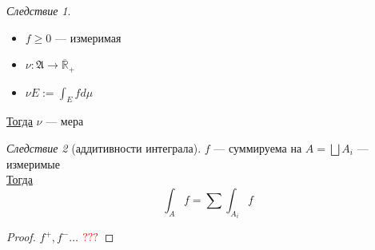 \documentclass[oneside]{book}
\newcommand{\R}{\mathbb{R}}
\newcommand{\A}{\mathfrak{A}}
\theoremstyle{plain}
\theoremstyle{remark}
\newtheorem{corollary}{Следствие}[theorem]
\theoremstyle{definition}
\begin{document}
\begin{corollary}
\begin{itemize}
\item \(f \ge 0\) --- измеримая
\item \(\nu: \A \to \overline{\R}_+\)
\item \(\nu E := \int_E fd\mu\)
\end{itemize}
\uline{Тогда} \(\nu\) --- мера
\end{corollary}
\begin{corollary}[аддитивности интеграла]
\(f\) --- суммируема на \(A = \bigsqcup A_i\) --- измеримые \\
\uline{Тогда} \[ \int_A f = \sum \int_{A_i} f \]
\end{corollary}
\begin{proof}
\(f^+, f^- \dots\) \(\color{red}???\)
\end{proof}
\end{document}

